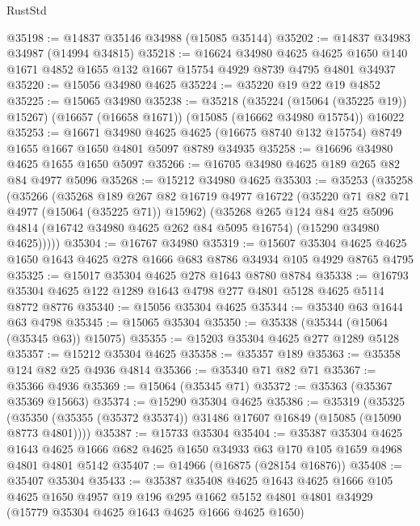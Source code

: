 \begin{lexlean}{RustStd}
\begin{coremodule}
@35198 := @14837 @35146 @34988 (@15085 @35144)
@35202 := @14837 @34983 @34987 (@14994 @34815)
@35218 := @16624
    @34980
    @4625
    @4625
    @1650
    @140
    @1671
    @4852
    @1655
    @132
    @1667
    @15754
    @4929
    @8739
    @4795
    @4801
    @34937
@35220 := @15056 @34980 @4625
@35224 := @35220 @19 @22 @19 @4852
@35225 := @15065 @34980
@35238 := @35218
    (@35224 (@15064 (@35225 @19)) @15267)
    (@16657 (@16658 @1671))
    (@15085 (@16662 @34980 @15754))
    @16022
@35253 := @16671
    @34980
    @4625
    @4625
    (@16675 @8740 @132 @15754)
    @8749
    @1655
    @1667
    @1650
    @4801
    @5097
    @8789
    @34935
@35258 := @16696 @34980 @4625 @1655 @1650 @5097
@35266 := @16705 @34980 @4625 @189 @265 @82 @84 @4977 @5096
@35268 := @15212 @34980 @4625
@35303 := @35253
    (@35258
      (@35266
        (@35268
          @189
          @267
          @82
          @16719
          @4977
          @16722
          (@35220 @71 @82 @71 @4977 (@15064 (@35225 @71)) @15962)
          (@35268
            @265
            @124
            @84
            @25
            @5096
            @4814
            (@16742 @34980 @4625 @262 @84 @5095 @16754)
            (@15290 @34980 @4625)))))
@35304 := @16767 @34980
@35319 := @15607
    @35304
    @4625
    @4625
    @1650
    @1643
    @4625
    @278
    @1666
    @683
    @8786
    @34934
    @105
    @4929
    @8765
    @4795
@35325 := @15017 @35304 @4625 @278 @1643 @8780 @8784
@35338 := @16793 @35304 @4625 @122 @1289 @1643 @4798 @277 @4801 @5128 @4625 @5114 @8772 @8776
@35340 := @15056 @35304 @4625
@35344 := @35340 @63 @1644 @63 @4798
@35345 := @15065 @35304
@35350 := @35338 (@35344 (@15064 (@35345 @63)) @15075)
@35355 := @15203 @35304 @4625 @277 @1289 @5128
@35357 := @15212 @35304 @4625
@35358 := @35357 @189
@35363 := @35358 @124 @82 @25 @4936 @4814
@35366 := @35340 @71 @82 @71
@35367 := @35366 @4936
@35369 := @15064 (@35345 @71)
@35372 := @35363 (@35367 @35369 @15663)
@35374 := @15290 @35304 @4625
@35386 := @35319
    (@35325 (@35350 (@35355 (@35372 @35374)) @31486 @17607 @16849 (@15085 (@15090 @8773 @4801))))
@35387 := @15733 @35304
@35404 := @35387
    @35304
    @4625
    @1643
    @4625
    @1666
    @682
    @4625
    @1650
    @34933
    @63
    @170
    @105
    @1659
    @4968
    @4801
    @4801
    @5142
@35407 := @14966 (@16875 (@28154 @16876))
@35408 := @35407 @35304
@35433 := @35387
    @35408
    @4625
    @1643
    @4625
    @1666
    @105
    @4625
    @1650
    @4957
    @19
    @196
    @295
    @1662
    @5152
    @4801
    @4801
    @34929
    (@15779 @35304 @4625 @1643 @4625 @1666 @4625 @1650)

\end{coremodule}
\end{lexlean}

